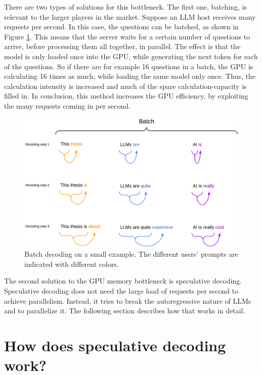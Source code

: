 There are two types of solutions for this bottleneck. The first one, batching, is relevant to the larger players in the market. Suppose an LLM host receives many requests per second. In this case, the questions can be batched, as shown in Figure \ref{fig:spec_dec_batch}. This means that the server waits for a certain number of questions to arrive, before processing them all together, in parallel. The effect is that the model is only loaded once into the GPU, while generating the next token for each of the questions. So if there are for example 16 questions in a batch, the GPU is calculating 16 times as much, while loading the same model only once. Thus, the calculation intensity is increased and much of the spare calculation-capacity is filled in. In conclusion, this method increases the GPU efficiency, by exploiting the many requests coming in per second.

\begin{figure}[h]
	\centering
	\includegraphics[width=1\linewidth]{fig/spec_dec_batch.png}
	\caption{Batch decoding on a small example. The different users' prompts are indicated with different colors.}
	\label{fig:spec_dec_batch}
\end{figure}

The second solution to the GPU memory bottleneck is speculative decoding. Speculative decoding does not need the large load of requests per second to achieve parallelism. Instead, it tries to break the autoregressive nature of LLMs and to parallelize it. The following section describes how that works in detail.

\section{How does speculative decoding work?}

